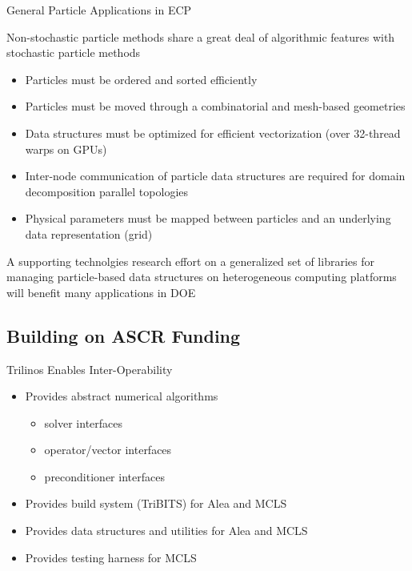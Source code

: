 \documentclass{beamer}
\begin{document}
\begin{frame}{General Particle Applications in ECP}

  Non-stochastic particle methods share a great deal of algorithmic features
  with stochastic particle methods
  \begin{itemize}
  \item Particles must be ordered and sorted efficiently
  \item Particles must be moved through a combinatorial and mesh-based
    geometries
  \item Data structures must be optimized for efficient vectorization (over
    32-thread warps on GPUs)
  \item Inter-node communication of particle data structures are required for
    domain decomposition parallel topologies
  \item Physical parameters must be mapped between particles and an underlying
    data representation (grid)
  \end{itemize}

  \vfill

  A supporting technolgies research effort on a generalized set of libraries
  for managing particle-based data structures on heterogeneous computing
  platforms will benefit many applications in DOE

\end{frame}

\subsection{Building on ASCR Funding}

\begin{frame}{Trilinos Enables Inter-Operability}

  \begin{itemize}
  \item Provides abstract numerical algorithms
    \begin{itemize}
    \item solver interfaces
    \item operator/vector interfaces
    \item preconditioner interfaces
    \end{itemize}
    \vfill
  \item Provides build system (TriBITS) for Alea and MCLS
    \vfill
  \item Provides data structures and utilities for Alea and MCLS
    \vfill
  \item Provides testing harness for MCLS
  \end{itemize}

\end{frame}
\end{document}
